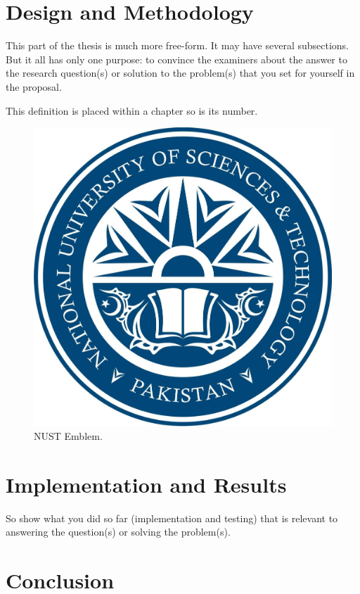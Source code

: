 \documentclass[11pt,a4paper,oneside]{book} %
\numberwithin{equation}{section}
\begin{document}
\chapter{Design and Methodology}
\label{c-methods}

This part of the thesis is much more free-form. It may have several subsections. But it all has only one purpose: to convince the examiners about the answer to the research question(s) or solution to the problem(s) that you set for yourself in the proposal.

\begin{definition}[Testing 1,2,3]
This definition is placed within a chapter so is its number.
\end{definition}

\begin{figure}[htp]
\begin{center}
  \includegraphics[width=0.7\columnwidth]{nust.jpg}
  \caption{NUST Emblem.}
  \label{f-nust}
\end{center}
\end{figure}


\chapter{Implementation and Results}
\label{c-results}

So show what you did so far (implementation and testing) that is relevant to
answering the question(s) or solving the problem(s).





\chapter{Conclusion}
\label{c-conclusion}
\end{document}
